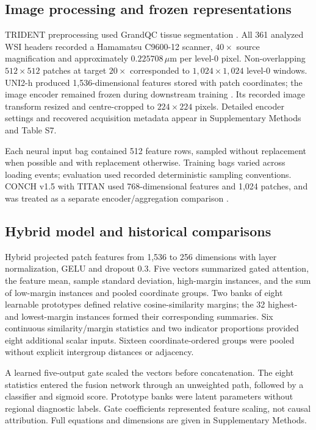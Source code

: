 \subsection{Image processing and frozen representations}

TRIDENT preprocessing used GrandQC tissue segmentation \citep{ref12}. All 361 analyzed WSI headers recorded a Hamamatsu C9600-12 scanner, $40\times$ source magnification and approximately $0.225708\,\mu\mathrm{m}$ per level-0 pixel. Non-overlapping $512\times512$ patches at target $20\times$ corresponded to $1{,}024\times1{,}024$ level-0 windows. UNI2-h produced 1,536-dimensional features stored with patch coordinates; the image encoder remained frozen during downstream training \citep{ref8,ref29}. Its recorded image transform resized and centre-cropped to $224\times224$ pixels. Detailed encoder settings and recovered acquisition metadata appear in Supplementary Methods and Table S7. 

Each neural input bag contained 512 feature rows, sampled without replacement when possible and with replacement otherwise. Training bags varied across loading events; evaluation used recorded deterministic sampling conventions. CONCH v1.5 with TITAN used 768-dimensional features and 1,024 patches, and was treated as a separate encoder/aggregation comparison \citep{ref13}.

\subsection{Hybrid model and historical comparisons}

Hybrid projected patch features from 1,536 to 256 dimensions with layer normalization, GELU and dropout 0.3. Five vectors summarized gated attention, the feature mean, sample standard deviation, high-margin instances, and the sum of low-margin instances and pooled coordinate groups. Two banks of eight learnable prototypes defined relative cosine-similarity margins; the 32 highest- and lowest-margin instances formed their corresponding summaries. Six continuous similarity/margin statistics and two indicator proportions provided eight additional scalar inputs. Sixteen coordinate-ordered groups were pooled without explicit intergroup distances or adjacency.

A learned five-output gate scaled the vectors before concatenation. The eight statistics entered the fusion network through an unweighted path, followed by a classifier and sigmoid score. Prototype banks were latent parameters without regional diagnostic labels. Gate coefficients represented feature scaling, not causal attribution. Full equations and dimensions are given in Supplementary Methods.

